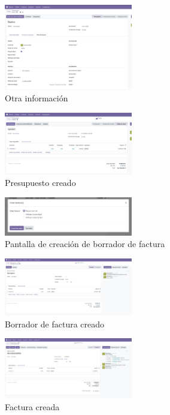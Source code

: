 \documentclass[a4paper,12pt]{article}
\begin{document}
\begin{figure}[h!]
    \centering
    \includegraphics[width=0.5\textwidth]{pr2odoo42-otraInfo.png}
    \caption{Otra información}
\end{figure}
\FloatBarrier

\begin{figure}[h!]
    \centering
    \includegraphics[width=0.5\textwidth]{pr2odoo43-presupuestoCreado.png}
    \caption{Presupuesto creado}
\end{figure}
\FloatBarrier

\begin{figure}[h!]
    \centering
    \includegraphics[width=0.5\textwidth]{pr2odoo44-crearBorradorFactura.png}
    \caption{Pantalla de creación de borrador de factura}
\end{figure}
\FloatBarrier

\begin{figure}[h!]
    \centering
    \includegraphics[width=0.5\textwidth]{pr2odoo45-borradorCreado.png}
    \caption{Borrador de factura creado}
\end{figure}
\FloatBarrier

\begin{figure}[h!]
    \centering
    \includegraphics[width=0.5\textwidth]{pr2odoo46-facturaCreada.png}
    \caption{Factura creada}
\end{figure}
\FloatBarrier
\end{document}
